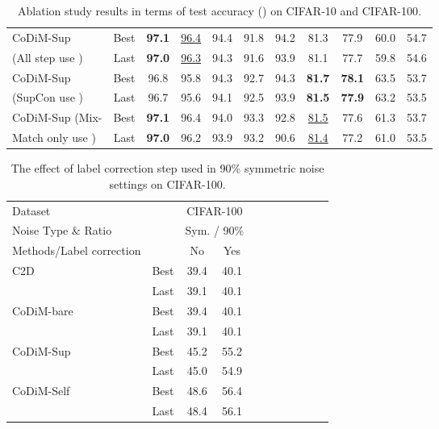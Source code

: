 \documentclass[letterpaper]{article} \usepackage{aaai22}  \usepackage{times}  \usepackage{helvet}  \usepackage{courier}  \usepackage[hyphens]{url}  \usepackage{graphicx} \usepackage{subfigure}
\begin{document}
\begin{table*}[ht]
\begin{center}
\begin{tabular}{lcccccccccc}
CoDiM-Sup & Best & \textbf{97.1} & \underline{96.4} & 94.4 & 91.8 & 94.2 & 81.3 & 77.9 & 60.0 & 54.7 \\
(All step use )& Last & \textbf{97.0} & \underline{96.3} & 94.3 & 91.6 & 93.9 & 81.1 & 77.7 & 59.8 & 54.6 \\
\hline
CoDiM-Sup & Best & 96.8 & 95.8 & 94.3 & 92.7 & 94.3 & \textbf{81.7} & \textbf{78.1} & 63.5 & 53.7 \\
(SupCon use ) & Last & 96.7 & 95.6 & 94.1 & 92.5 & 93.9 & \textbf{81.5} & \textbf{77.9} & 63.2 & 53.5 \\
\hline
CoDiM-Sup (Mix-& Best & \textbf{97.1} & 96.4 & 94.0 & 93.3 & 92.8 & \underline{81.5} & 77.6 & 61.3 & 53.7 \\
Match only use  )& Last & \textbf{97.0} & 96.2 & 93.9 & 93.2 & 90.6 & \underline{81.4} & 77.2 & 61.0 & 53.5 \\
\hline
\end{tabular}
\end{center}
\caption{Ablation study results in terms of test accuracy () on CIFAR-10 and CIFAR-100.}
\label{tab:tableC1}
\end{table*}


\begin{table}[ht]
\begin{center}
\begin{tabular}{lcccccccccc}
\hline
Dataset & & \multicolumn{2}{c}{CIFAR-100} \\
Noise Type \& Ratio & & \multicolumn{2}{c}{Sym. / 90\%}\\
\hline
Methods/Label correction& & No &Yes \\
\hline
\multirow{2}{*}{C2D} & Best & 39.4 & 40.1 \\
& Last & 39.1 & 40.1 \\
\hline
\multirow{2}{*}{CoDiM-bare} & Best & 39.4 & 40.1 \\
& Last & 39.1 & 40.1 \\
\hline
\multirow{2}{*}{CoDiM-Sup} & Best & 45.2 & 55.2 \\
& Last & 45.0 & 54.9 \\
\hline
\multirow{2}{*}{CoDiM-Self} & Best & 48.6 & 56.4 \\
& Last & 48.4 & 56.1 \\
\hline
\end{tabular}
\end{center}
\caption{The effect of label correction step used in 90\% symmetric noise settings on CIFAR-100. }
\label{tab:table7_app}
\end{table}
\end{document}
